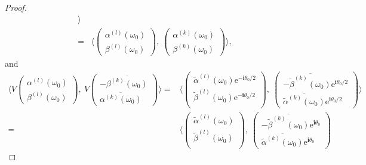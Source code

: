 \documentclass[pdflatex,sn-mathphys-num]{sn-jnl}%
\theoremstyle{thmstyleone}%
\theoremstyle{thmstyletwo}%
\theoremstyle{thmstylethree}%
\theoremstyle{definition}
\theoremstyle{remark}
\begin{document}
\begin{proof}
\begin{equation*}
\begin{aligned}
    \rangle \\
     = & \langle
     \begin{pmatrix}
     	\alpha^{(l)}(\omega_0) \\
     	\beta^{(l)}(\omega_0)
     \end{pmatrix},\
       \begin{pmatrix}
     	\alpha^{(k)}(\omega_0) \\
     	\beta^{(k)}(\omega_0)
     \end{pmatrix}
     \rangle,
    \end{aligned}
    \end{equation*}
and
     \begin{equation*}
	\begin{aligned}
		\langle V
		\begin{pmatrix}
			\alpha^{(l)}(\omega_0) \\
			\beta^{(l)}(\omega_0)
		\end{pmatrix},\
		 V
		\begin{pmatrix}
			-\overline{\beta^{(k)}(\omega_0)} \\
			\overline{\alpha^{(k)}(\omega_0)}
		\end{pmatrix}
		\rangle
		= & \langle
		\begin{pmatrix}
			\widetilde{\alpha}^{(l)}(\omega_0)\mathrm{e}^{-\boldsymbol{i}\theta_0/2} \\
			\widetilde{\beta}^{(l)}(\omega_0)\mathrm{e}^{-\boldsymbol{i}\theta_0/2} \\
		\end{pmatrix},\
		\begin{pmatrix}
			-\overline{\widetilde{\beta}^{(k)}(\omega_0)}\mathrm{e}^{\boldsymbol{i}\theta_0/2} \\
			\overline{\widetilde{\alpha}^{(k)}(\omega_0)}\mathrm{e}^{\boldsymbol{i}\theta_0/2}
		\end{pmatrix}
		\rangle \\
		= &
		\langle
		\begin{pmatrix}
			\widetilde{\alpha}^{(l)}(\omega_0) \\
			\widetilde{\beta}^{(l)}(\omega_0)\\
		\end{pmatrix},\
		\begin{pmatrix}
			-\overline{\widetilde{\beta}^{(k)}(\omega_0)}\mathrm{e}^{\boldsymbol{i}\theta_0} \\
			\overline{\widetilde{\alpha}^{(k)}(\omega_0)}\mathrm{e}^{\boldsymbol{i}\theta_0}
		\end{pmatrix}

\end{aligned}
\end{equation*}
\end{proof}
\end{document}
